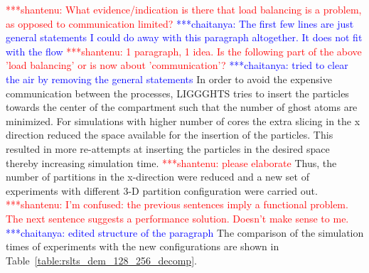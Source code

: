 \documentclass[preprint,11pt,authoryear]{elsarticle}
\newcommand{\jhanote}[1]{ {\textcolor{red} { ***shantenu: #1 }}}
\newcommand{\csnote}[1]{ {\textcolor{blue} { ***chaitanya: #1 }}}
\newcommand{\jhanote}[1]{ {\textcolor{red} { ***shantenu: #1 }}}
\newcommand{\csnote}[1]{}
\begin{document}
\jhanote{What evidence/indication is there that load balancing is
a problem, as opposed to communication limited?} \csnote{The first few lines 
are  just general statements I could do away with this paragraph altogether. 
It does not fit with the flow} %
\jhanote{1 paragraph, 1 idea. Is the following part of the above 'load balancing' or is 
now about 'communication'?} \csnote{tried to clear the air by removing the general statements}
In order to avoid the expensive communication
between the processes, LIGGGHTS tries to insert the particles towards the
center of the compartment such that the number of ghost atoms are minimized.
For simulations with higher number of cores the extra slicing in the x direction 
reduced the space available for the insertion of the particles.
This resulted in more re-attempts at inserting the particles in the desired space 
thereby increasing simulation time.
\jhanote{please elaborate} 
Thus, the number of partitions in the x-direction were reduced and a new set of 
experiments with different 3-D partition configuration were carried out. 
\jhanote{I'm
confused: the previous sentences imply a functional problem. The next sentence
suggests a performance solution. Doesn't make sense to me.} \csnote{edited structure of the paragraph}
The comparison of the simulation times of experiments with the new configurations are shown in
Table~\ref{table:rslts_dem_128_256_decomp}.
\end{document}
